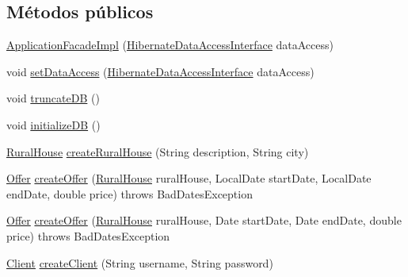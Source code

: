 \subsection*{Métodos públicos}
\begin{DoxyCompactItemize}
\item 
\mbox{\hyperlink{classcom_1_1ruralhousejsf_1_1business_logic_1_1_application_facade_impl_ad6ed360c754c5ba82a2b88bb4cf036f7}{Application\+Facade\+Impl}} (\mbox{\hyperlink{interfacecom_1_1ruralhousejsf_1_1data_access_1_1_hibernate_data_access_interface}{Hibernate\+Data\+Access\+Interface}} data\+Access)
\item 
void \mbox{\hyperlink{classcom_1_1ruralhousejsf_1_1business_logic_1_1_application_facade_impl_a78fc6968b9fec7aa475b322463b6bd92}{set\+Data\+Access}} (\mbox{\hyperlink{interfacecom_1_1ruralhousejsf_1_1data_access_1_1_hibernate_data_access_interface}{Hibernate\+Data\+Access\+Interface}} data\+Access)
\item 
void \mbox{\hyperlink{classcom_1_1ruralhousejsf_1_1business_logic_1_1_application_facade_impl_a5fe9f44c95b3459fb8999c26e5b934cb}{truncate\+DB}} ()
\item 
void \mbox{\hyperlink{classcom_1_1ruralhousejsf_1_1business_logic_1_1_application_facade_impl_a1e6cbb70c9568899c86135b3264b431d}{initialize\+DB}} ()
\item 
\mbox{\hyperlink{classcom_1_1ruralhousejsf_1_1domain_1_1_rural_house}{Rural\+House}} \mbox{\hyperlink{classcom_1_1ruralhousejsf_1_1business_logic_1_1_application_facade_impl_a48b82f812a30271878f50b99ae16a24b}{create\+Rural\+House}} (String description, String city)
\item 
\mbox{\hyperlink{classcom_1_1ruralhousejsf_1_1domain_1_1_offer}{Offer}} \mbox{\hyperlink{classcom_1_1ruralhousejsf_1_1business_logic_1_1_application_facade_impl_acbf81cc6dc4bf9adf9ea7a85751edfc0}{create\+Offer}} (\mbox{\hyperlink{classcom_1_1ruralhousejsf_1_1domain_1_1_rural_house}{Rural\+House}} rural\+House, Local\+Date start\+Date, Local\+Date end\+Date, double price)  throws Bad\+Dates\+Exception 
\item 
\mbox{\hyperlink{classcom_1_1ruralhousejsf_1_1domain_1_1_offer}{Offer}} \mbox{\hyperlink{classcom_1_1ruralhousejsf_1_1business_logic_1_1_application_facade_impl_a9aafb2ac6e91d643bc5dd1f5691d4075}{create\+Offer}} (\mbox{\hyperlink{classcom_1_1ruralhousejsf_1_1domain_1_1_rural_house}{Rural\+House}} rural\+House, Date start\+Date, Date end\+Date, double price)  throws Bad\+Dates\+Exception 
\item 
\mbox{\hyperlink{classcom_1_1ruralhousejsf_1_1domain_1_1_client}{Client}} \mbox{\hyperlink{classcom_1_1ruralhousejsf_1_1business_logic_1_1_application_facade_impl_ae48e63f3df5226e46e4a57a64d120823}{create\+Client}} (String username, String password)

\end{DoxyCompactItemize}
